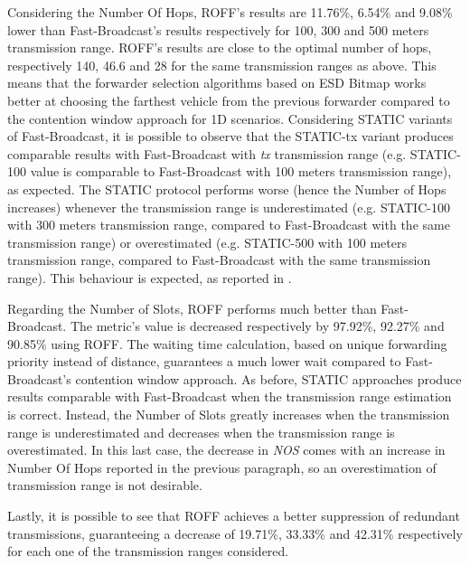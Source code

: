 		
		Considering the Number Of Hops, ROFF's results are 11.76\%, 6.54\% and 9.08\% lower than Fast-Broadcast's results respectively for 100, 300 and 500 meters transmission range. ROFF's results are close to the optimal number of hops, respectively 140, 46.6 and 28 for the same transmission ranges as above. This means that the forwarder selection algorithms based on ESD Bitmap works better at choosing the farthest vehicle from the previous forwarder compared to the contention window approach for 1D scenarios. Considering STATIC variants of Fast-Broadcast, it is possible to observe that the STATIC-tx variant produces comparable results with Fast-Broadcast with \textit{tx} transmission range (e.g. STATIC-100 value is comparable to Fast-Broadcast with 100 meters transmission range), as expected. The STATIC protocol performs worse (hence the Number of Hops increases) whenever the transmission range is underestimated (e.g. STATIC-100 with 300 meters transmission range, compared to Fast-Broadcast with the same transmission range) or overestimated (e.g. STATIC-500 with 100 meters transmission range, compared to Fast-Broadcast with the same transmission range). This behaviour is expected, as reported in \cite{BAR2017}.
		
		
		Regarding the Number of Slots, ROFF performs much better than Fast-Broadcast. The metric's value is decreased respectively by 97.92\%, 92.27\% and 90.85\% using ROFF. The waiting time calculation, based on unique forwarding priority instead of distance, guarantees a much lower wait compared to Fast-Broadcast's contention window approach. As before, STATIC approaches produce results comparable with Fast-Broadcast when the transmission range estimation is correct. Instead, the Number of Slots greatly increases when the transmission range is underestimated and decreases when the transmission range is overestimated. In this last case, the decrease in \textit{NOS} comes with an increase in Number Of Hops reported in the previous paragraph, so an overestimation of transmission range is not desirable.
		
		
		Lastly, it is possible to see that ROFF achieves a better suppression of redundant transmissions, guaranteeing a decrease of 19.71\%, 33.33\% and 42.31\% respectively for each one of the transmission ranges considered.
		
		
